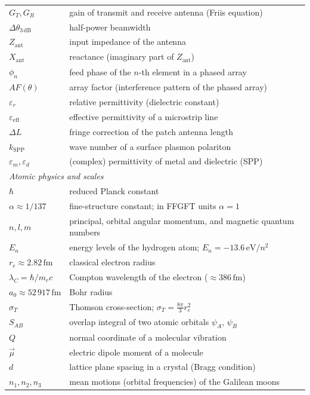 \begin{longtable}{@{}lp{7cm}@{}}
$G_T, G_R$ & gain of transmit and receive antenna (Friis equation) \\
$\Delta\theta_{3\,\mathrm{dB}}$ & half-power beamwidth \\
$Z_\mathrm{ant}$ & input impedance of the antenna \\
$X_\mathrm{ant}$ & reactance (imaginary part of $Z_\mathrm{ant}$) \\
$\phi_n$ & feed phase of the $n$-th element in a phased array \\
$AF(\theta)$ & array factor (interference pattern of the phased array) \\
$\varepsilon_r$ & relative permittivity (dielectric constant) \\
$\varepsilon_\mathrm{eff}$ & effective permittivity of a microstrip line \\
$\Delta L$ & fringe correction of the patch antenna length \\
$k_\mathrm{SPP}$ & wave number of a surface plasmon polariton \\
$\varepsilon_m, \varepsilon_d$ & (complex) permittivity of metal and dielectric (SPP) \\
\midrule
\multicolumn{2}{l}{\textit{Atomic physics and scales}} \\
$\hbar$ & reduced Planck constant \\
$\alpha \approx 1/137$ & fine-structure constant; in FFGFT units $\alpha = 1$ \\
$n, l, m$ & principal, orbital angular momentum, and magnetic quantum numbers \\
$E_n$ & energy levels of the hydrogen atom; $E_n = -13.6\,\mathrm{eV}/n^2$ \\
$r_e \approx 2.82\,\mathrm{fm}$ & classical electron radius \\
$\lambda_C = \hbar/m_e c$ & Compton wavelength of the electron (${\approx}386\,\mathrm{fm}$) \\
$a_0 \approx 52\,917\,\mathrm{fm}$ & Bohr radius \\
$\sigma_T$ & Thomson cross-section; $\sigma_T = \tfrac{8\pi}{3}r_e^2$ \\
$S_{AB}$ & overlap integral of two atomic orbitals $\psi_A$, $\psi_B$ \\
$Q$ & normal coordinate of a molecular vibration \\
$\vec{\mu}$ & electric dipole moment of a molecule \\
$d$ & lattice plane spacing in a crystal (Bragg condition) \\
$n_1, n_2, n_3$ & mean motions (orbital frequencies) of the Galilean moons \\
\bottomrule
\end{longtable}

